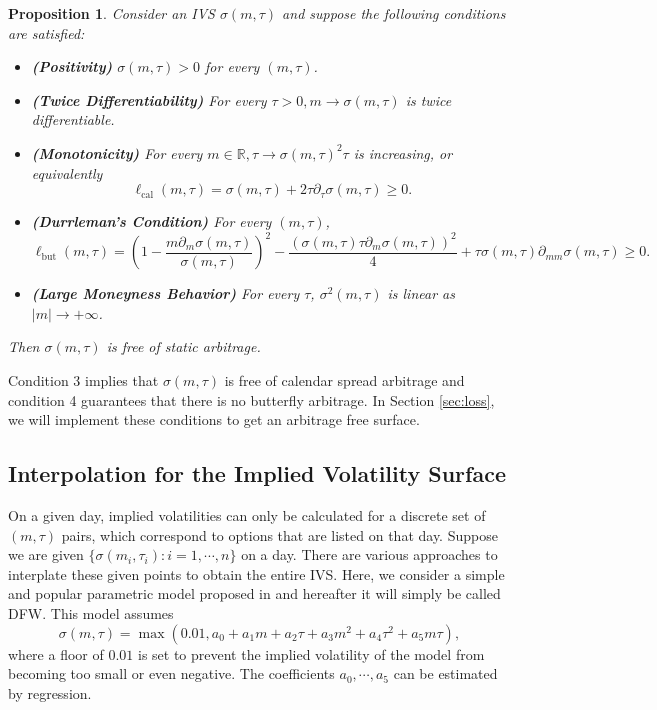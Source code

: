\documentclass[11pt,a4paper]{article}
\newtheorem{proposition}{Proposition}
\theoremstyle{remark}
\begin{document}
\begin{proposition}\label{prop: NA}
Consider an IVS $\sigma(m,\tau)$ and suppose the following conditions are satisfied:
\begin{itemize} 
\item[1.] \textbf {(Positivity)} $\sigma(m, \tau)>0$ for every $(m, \tau)$.

\item[2.] \textbf{(Twice Differentiability)} For every $\tau>0, m \rightarrow \sigma(m, \tau)$ is twice differentiable.

\item[3.] \textbf{(Monotonicity)} For every $m \in \mathbb{R}, \tau \rightarrow \sigma(m, \tau)^{2}\tau$ is increasing, or equivalently
\begin{equation}\label{cal-NA}
\ell_{\mathrm{cal}}(m, \tau) = \sigma(m, \tau)+2 \tau \partial_{\tau} \sigma(m, \tau) \geq 0.
\end{equation}

\item[4.] \textbf{(Durrleman’s Condition)} For every $(m, \tau)$,
\begin{equation}\label{but-NA}
	\ell_{\mathrm{but}}(m, \tau) = \left(1-\frac{m \partial_{m} \sigma(m, \tau)}{\sigma(m, \tau)}\right)^{2}- \frac{\left(\sigma(m, \tau) \tau \partial_{m} \sigma(m, \tau)\right)^{2}}{4} +\tau \sigma(m, \tau) \partial_{m m} \sigma(m, \tau) \geq 0. 
\end{equation}

\item[5.] \textbf{(Large Moneyness Behavior)} For every $\tau$, $\sigma^2(m, \tau)$ is linear as $|m| \rightarrow + \infty$.
\end{itemize}
Then $\sigma(m,\tau)$ is free of static arbitrage. 
\end{proposition}

Condition 3 implies that $\sigma(m, \tau)$ is free of calendar spread arbitrage and condition 4 guarantees that there is no butterfly arbitrage. In Section \ref{sec:loss}, we will implement these conditions to get an arbitrage free surface. 

\subsection{Interpolation for the Implied Volatility Surface}
On a given day, implied volatilities can only be calculated for a discrete set of $(m,\tau)$ pairs, which correspond to options that are listed on that day. Suppose we are given $\{\sigma(m_i,\tau_i): i=1,\cdots,n\}$ on a day. There are various approaches to interplate these given points to obtain the entire IVS. Here, we consider a simple and popular parametric model proposed in \cite{dumas1998implied} and hereafter it will simply be called DFW. This model assumes
\begin{equation}\label{poly}
	\sigma(m, \tau) = \max(0.01, a_0 + a_1 m + a_2 \tau + a_3 m^2 + a_4 \tau^2 + a_5 m\tau),
\end{equation}
where a floor of $0.01$ is set to prevent the implied volatility of the model from becoming too small or even negative. The coefficients $a_0,\cdots,a_5$ can be estimated by regression. 
\end{document}
